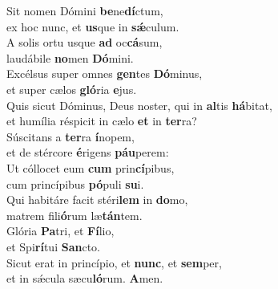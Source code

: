 \evenverse Sit nomen Dómini \textbf{be}ne\textbf{dí}ctum,~\*\\
\evenverse ex hoc nunc, et \textbf{us}que in \textbf{sǽ}culum.\\
\oddverse A solis ortu usque \textbf{ad} oc\textbf{cá}sum,~\*\\
\oddverse laudábile \textbf{no}men \textbf{Dó}mini.\\
\evenverse Excélsus super omnes \textbf{gen}tes \textbf{Dó}minus,~\*\\
\evenverse et super cælos \textbf{gló}ria \textbf{e}jus.\\
\oddverse Quis sicut Dóminus, Deus noster, qui in \textbf{al}tis \textbf{há}bitat,~\*\\
\oddverse et humília réspicit in cælo \textbf{et} in \textbf{ter}ra?\\
\evenverse Súscitans a \textbf{ter}ra \textbf{í}nopem,~\*\\
\evenverse et de stércore \textbf{é}rigens \textbf{páu}perem:\\
\oddverse Ut cóllocet eum \textbf{cum} prin\textbf{cí}pibus,~\*\\
\oddverse cum princípibus \textbf{pó}puli \textbf{su}i.\\
\evenverse Qui habitáre facit stéri\textbf{lem} in \textbf{do}mo,~\*\\
\evenverse matrem fili\textbf{ó}rum læ\textbf{tán}tem.\\
\oddverse Glória \textbf{Pa}tri, et \textbf{Fí}lio,~\*\\
\oddverse et Spi\textbf{rí}tui \textbf{San}cto.\\
\evenverse Sicut erat in princípio, et \textbf{nunc}, et \textbf{sem}per,~\*\\
\evenverse et in sǽcula sæcu\textbf{ló}rum. \textbf{A}men.\\
